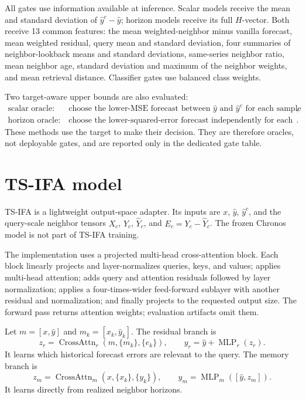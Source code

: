 \documentclass[11pt]{article}
\begin{document}
All gates use information available at inference.  Scalar models receive the
mean and standard deviation of $\hat y^c-\hat y$; horizon models receive its
full $H$-vector.  Both receive 13 common features: the mean weighted-neighbor
minus vanilla forecast, mean weighted residual, query mean and standard
deviation, four summaries of neighbor-lookback means and standard deviations,
same-series neighbor ratio, mean neighbor age, standard deviation and maximum
of the neighbor weights, and mean retrieval distance.  Classifier gates use
balanced class weights.

Two target-aware upper bounds are also evaluated:
\begin{align*}
\text{scalar oracle:}\quad
  &\text{choose the lower-MSE forecast between $\hat y$ and $\hat y^c$ for each sample},\\
\text{horizon oracle:}\quad
  &\text{choose the lower-squared-error forecast independently for each horizon step}.
\end{align*}
These methods use the target to make their decision.  They are therefore
oracles, not deployable gates, and are reported only in the dedicated gate
table.

\section{TS-IFA model}

TS-IFA is a lightweight output-space adapter.  Its inputs are $x$, $\hat y$,
$\hat y^c$, and the query-scale neighbor tensors $X_c$, $Y_c$, $\hat Y_c$, and
$E_c=Y_c-\hat Y_c$.  The frozen Chronos model is not part of TS-IFA training.

The implementation uses a projected multi-head cross-attention block.  Each
block linearly projects and layer-normalizes queries, keys, and values; applies
multi-head attention; adds query and attention residuals followed by layer
normalization; applies a four-times-wider feed-forward sublayer with another
residual and normalization; and finally projects to the requested output size.
The forward pass returns attention weights; evaluation artifacts omit them.

Let $m=[x,\hat y]$ and $m_k=[x_k,\hat y_k]$.  The residual branch is
\[
  z_r=\operatorname{CrossAttn}_r(m,\{m_k\},\{e_k\}),\qquad
  y_r=\hat y+\operatorname{MLP}_r(z_r).
\]
It learns which historical forecast errors are relevant to the query.  The
memory branch is
\[
  z_m=\operatorname{CrossAttn}_m(x,\{x_k\},\{y_k\}),\qquad
  y_m=\operatorname{MLP}_m([\hat y,z_m]).
\]
It learns directly from realized neighbor horizons.
\end{document}
